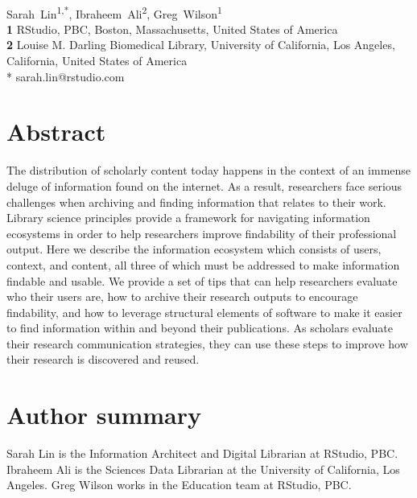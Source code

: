 \documentclass[10pt,letterpaper]{article}
\begin{document}
\vspace*{0.2in}

\begin{flushleft}
{\Large
\textbf{}
}
\newline
\\
{Sarah~Lin}\textsuperscript{1,*},
{Ibraheem~Ali}\textsuperscript{2},
{Greg~Wilson}\textsuperscript{1}
\\
\textbf{1} RStudio, PBC, Boston, Massachusetts, United States of America \\
\textbf{2} Louise M. Darling Biomedical Library, University of California, Los Angeles, California, United States of America
\\
\bigskip
* sarah.lin@rstudio.com
\end{flushleft}

\section*{Abstract}

The distribution of scholarly content today happens in the context of an immense
deluge of information found on the internet. As a result, researchers face 
serious challenges when archiving and finding information that relates to their work.
Library science principles provide a framework for navigating information ecosystems
in order to help researchers improve findability of their professional output. Here
we describe the information ecosystem which consists of users, context, and 
content, all three of which must be addressed to make information findable and usable. 
We provide a set of tips that can help researchers evaluate who their users are, 
how to archive their research outputs to encourage findability, and how to leverage 
structural elements of software to make it easier to find information within and beyond
their publications. As scholars evaluate their research communication strategies, 
they can use these steps to improve how their research is discovered and reused.

\section*{Author summary}

Sarah Lin is the Information Architect and Digital Librarian at RStudio, PBC.
Ibraheem Ali is the Sciences Data Librarian at the University of California, Los Angeles.
Greg Wilson works in the Education team at RStudio, PBC.
\end{document}
